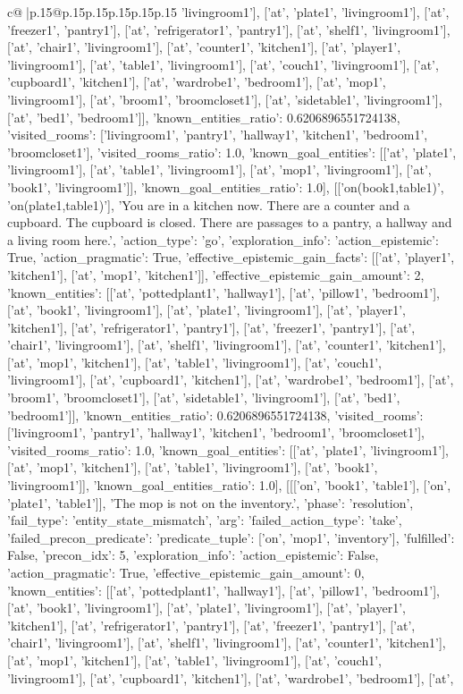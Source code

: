 \documentclass{article}
\begin{document}
{\begin{supertabular}{c@{$\;$}|p{.15\linewidth}@{}p{.15\linewidth}p{.15\linewidth}p{.15\linewidth}p{.15\linewidth}p{.15\linewidth}}
{{{'livingroom1'], ['at', 'plate1', 'livingroom1'], ['at', 'freezer1', 'pantry1'], ['at', 'refrigerator1', 'pantry1'], ['at', 'shelf1', 'livingroom1'], ['at', 'chair1', 'livingroom1'], ['at', 'counter1', 'kitchen1'], ['at', 'player1', 'livingroom1'], ['at', 'table1', 'livingroom1'], ['at', 'couch1', 'livingroom1'], ['at', 'cupboard1', 'kitchen1'], ['at', 'wardrobe1', 'bedroom1'], ['at', 'mop1', 'livingroom1'], ['at', 'broom1', 'broomcloset1'], ['at', 'sidetable1', 'livingroom1'], ['at', 'bed1', 'bedroom1']], 'known_entities_ratio': 0.6206896551724138, 'visited_rooms': ['livingroom1', 'pantry1', 'hallway1', 'kitchen1', 'bedroom1', 'broomcloset1'], 'visited_rooms_ratio': 1.0, 'known_goal_entities': [['at', 'plate1', 'livingroom1'], ['at', 'table1', 'livingroom1'], ['at', 'mop1', 'livingroom1'], ['at', 'book1', 'livingroom1']], 'known_goal_entities_ratio': 1.0}}], [['on(book1,table1)', 'on(plate1,table1)'], 'You are in a kitchen now. There are a counter and a cupboard. The cupboard is closed. There are passages to a pantry, a hallway and a living room here.', {'action_type': 'go', 'exploration_info': {'action_epistemic': True, 'action_pragmatic': True, 'effective_epistemic_gain_facts': [['at', 'player1', 'kitchen1'], ['at', 'mop1', 'kitchen1']], 'effective_epistemic_gain_amount': 2, 'known_entities': [['at', 'pottedplant1', 'hallway1'], ['at', 'pillow1', 'bedroom1'], ['at', 'book1', 'livingroom1'], ['at', 'plate1', 'livingroom1'], ['at', 'player1', 'kitchen1'], ['at', 'refrigerator1', 'pantry1'], ['at', 'freezer1', 'pantry1'], ['at', 'chair1', 'livingroom1'], ['at', 'shelf1', 'livingroom1'], ['at', 'counter1', 'kitchen1'], ['at', 'mop1', 'kitchen1'], ['at', 'table1', 'livingroom1'], ['at', 'couch1', 'livingroom1'], ['at', 'cupboard1', 'kitchen1'], ['at', 'wardrobe1', 'bedroom1'], ['at', 'broom1', 'broomcloset1'], ['at', 'sidetable1', 'livingroom1'], ['at', 'bed1', 'bedroom1']], 'known_entities_ratio': 0.6206896551724138, 'visited_rooms': ['livingroom1', 'pantry1', 'hallway1', 'kitchen1', 'bedroom1', 'broomcloset1'], 'visited_rooms_ratio': 1.0, 'known_goal_entities': [['at', 'plate1', 'livingroom1'], ['at', 'mop1', 'kitchen1'], ['at', 'table1', 'livingroom1'], ['at', 'book1', 'livingroom1']], 'known_goal_entities_ratio': 1.0}}], [[['on', 'book1', 'table1'], ['on', 'plate1', 'table1']], 'The mop is not on the inventory.', {'phase': 'resolution', 'fail_type': 'entity_state_mismatch', 'arg': {'failed_action_type': 'take', 'failed_precon_predicate': {'predicate_tuple': ['on', 'mop1', 'inventory'], 'fulfilled': False, 'precon_idx': 5}}, 'exploration_info': {'action_epistemic': False, 'action_pragmatic': True, 'effective_epistemic_gain_amount': 0, 'known_entities': [['at', 'pottedplant1', 'hallway1'], ['at', 'pillow1', 'bedroom1'], ['at', 'book1', 'livingroom1'], ['at', 'plate1', 'livingroom1'], ['at', 'player1', 'kitchen1'], ['at', 'refrigerator1', 'pantry1'], ['at', 'freezer1', 'pantry1'], ['at', 'chair1', 'livingroom1'], ['at', 'shelf1', 'livingroom1'], ['at', 'counter1', 'kitchen1'], ['at', 'mop1', 'kitchen1'], ['at', 'table1', 'livingroom1'], ['at', 'couch1', 'livingroom1'], ['at', 'cupboard1', 'kitchen1'], ['at', 'wardrobe1', 'bedroom1'], ['at', }}}
\end{supertabular}}
\end{document}
